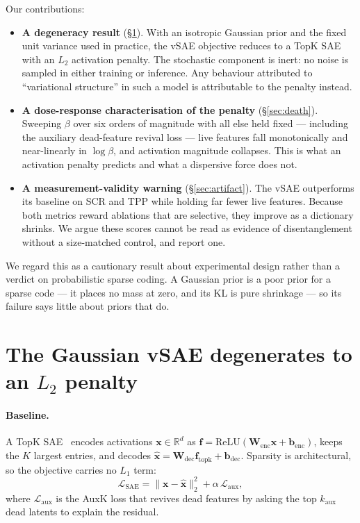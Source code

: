 \documentclass{article}
\begin{document}
Our contributions:

\begin{itemize}
\item \textbf{A degeneracy result} (\S\ref{sec:degeneracy}). With an isotropic
Gaussian prior and the fixed unit variance used in practice, the vSAE objective
reduces to a TopK SAE with an $L_2$ activation penalty. The stochastic component
is inert: no noise is sampled in either training or inference. Any behaviour
attributed to ``variational structure'' in such a model is attributable to the
penalty instead.

\item \textbf{A dose-response characterisation of the penalty}
(\S\ref{sec:death}). Sweeping $\beta$ over six orders of magnitude with all else
held fixed --- including the auxiliary dead-feature revival loss --- live features
fall monotonically and near-linearly in $\log\beta$, and activation magnitude
collapses. This is what an activation penalty predicts and what a dispersive force
does not.

\item \textbf{A measurement-validity warning} (\S\ref{sec:artifact}). The vSAE
outperforms its baseline on SCR and TPP while holding far fewer live features.
Because both metrics reward ablations that are selective, they improve as a
dictionary shrinks. We argue these scores cannot be read as evidence of
disentanglement without a size-matched control, and report one.
\end{itemize}

We regard this as a cautionary result about experimental design rather than a
verdict on probabilistic sparse coding. A Gaussian prior is a poor prior for a
sparse code --- it places no mass at zero, and its KL is pure shrinkage --- so its
failure says little about priors that do.

\section{The Gaussian vSAE degenerates to an $L_2$ penalty}
\label{sec:degeneracy}

\paragraph{Baseline.} A TopK SAE~\citep{gao2024scalingevaluatingsparseautoencoders}
encodes activations $\mathbf{x}\in\mathbb{R}^d$ as
$\mathbf{f}=\mathrm{ReLU}(\mathbf{W}_{\mathrm{enc}}\mathbf{x}+\mathbf{b}_{\mathrm{enc}})$,
keeps the $K$ largest entries, and decodes
$\hat{\mathbf{x}}=\mathbf{W}_{\mathrm{dec}}\mathbf{f}_{\mathrm{topk}}+\mathbf{b}_{\mathrm{dec}}$.
Sparsity is architectural, so the objective carries no $L_1$ term:
\begin{equation}
\mathcal{L}_{\mathrm{SAE}} = \|\mathbf{x}-\hat{\mathbf{x}}\|_2^2
+ \alpha\,\mathcal{L}_{\mathrm{aux}},
\label{eq:sae}
\end{equation}
where $\mathcal{L}_{\mathrm{aux}}$ is the AuxK loss that revives dead features by
asking the top $k_{\mathrm{aux}}$ dead latents to explain the residual.
\end{document}
